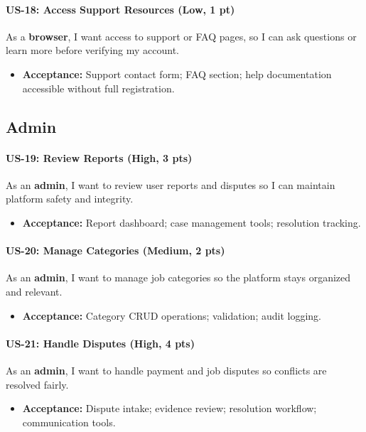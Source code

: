 \documentclass[11pt]{article}
\begin{document}
\paragraph{US-18: Access Support Resources (Low, 1 pt)}
As a \textbf{browser}, I want access to support or FAQ pages, so I can ask questions or learn more before verifying my account.
\begin{itemize}[leftmargin=1.4em]
  \item \textbf{Acceptance:} Support contact form; FAQ section; help documentation accessible without full registration.
\end{itemize}

\subsection*{Admin}
\paragraph{US-19: Review Reports (High, 3 pts)}
As an \textbf{admin}, I want to review user reports and disputes so I can maintain platform safety and integrity.
\begin{itemize}[leftmargin=1.4em]
  \item \textbf{Acceptance:} Report dashboard; case management tools; resolution tracking.
\end{itemize}

\paragraph{US-20: Manage Categories (Medium, 2 pts)}
As an \textbf{admin}, I want to manage job categories so the platform stays organized and relevant.
\begin{itemize}[leftmargin=1.4em]
  \item \textbf{Acceptance:} Category CRUD operations; validation; audit logging.
\end{itemize}

\paragraph{US-21: Handle Disputes (High, 4 pts)}
As an \textbf{admin}, I want to handle payment and job disputes so conflicts are resolved fairly.
\begin{itemize}[leftmargin=1.4em]
  \item \textbf{Acceptance:} Dispute intake; evidence review; resolution workflow; communication tools.
\end{itemize}
\end{document}
